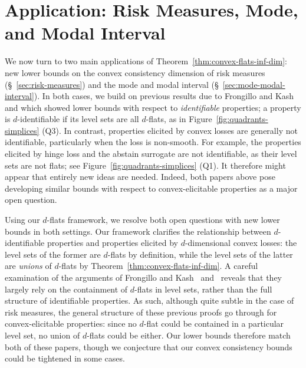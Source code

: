 \documentclass{article} %
\begin{document}
\section{Application: Risk Measures, Mode, and Modal Interval}\label{sec:contin-consis}

We now turn to two main applications of Theorem~\ref{thm:convex-flats-inf-dim}: new lower bounds on the convex consistency dimension of risk measures (\S~\ref{sec:risk-measures}) and the mode and modal interval (\S~\ref{sec:mode-modal-interval}).
In both cases, we build on previous results due to Frongillo and Kash~\citep{frongillo2020elicitation,frongillo2015elicitation} and \citet{dearborn2020indirect} which showed lower bounds with respect to \emph{identifiable} properties;
a property is $d$-identifiable if its level sets are all $d$-flats, as in Figure~\ref{fig:quadrants-simplices} (Q3).
In contrast, properties elicited by convex losses are generally not identifiable, particularly when the loss is non-smooth.
For example, the properties elicited by hinge loss and the abstain surrogate are not identifiable, as their level sets are not flats; see Figure~\ref{fig:quadrants-simplices} (Q1).
It therefore might appear that entirely new ideas are needed.
Indeed, both papers above pose developing similar bounds with respect to convex-elicitable properties as a major open question.

Using our $d$-flats framework, we resolve both open questions with new lower bounds in both settings.
Our framework clarifies the relationship between $d$-identifiable properties and properties elicited by $d$-dimensional convex losses: the level sets of the former are $d$-flats by definition, while the level sets of the latter are \emph{unions} of $d$-flats by Theorem~\ref{thm:convex-flats-inf-dim}.
A careful examination of the arguments of Frongillo and Kash~\citep{frongillo2020elicitation,frongillo2015elicitation} and~\citet{dearborn2020indirect} reveals that they largely rely on the containment of $d$-flats in level sets, rather than the full structure of identifiable properties.
As such, although quite subtle in the case of risk measures, the general structure of these previous proofs go through for convex-elicitable properties: since no $d$-flat could be contained in a particular level set, no union of $d$-flats could be either.
Our lower bounds therefore match both of these papers, though we conjecture that our convex consistency bounds could be tightened in some cases.
\end{document}
